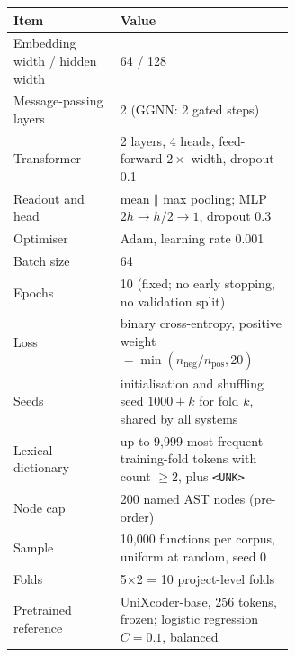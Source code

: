 \documentclass[pdflatex,sn-basic]{sn-jnl}
\let\toprule\hline\let\midrule\hline\let\bottomrule\hline\let\botrule\hline
\theoremstyle{thmstyleone}%
\begin{document}
\begin{tableorg}[t]
\centering
\caption{Hyper-parameters. All values are fixed in advance and shared by every
compared system; none is tuned on any fold.}
\label{tab:hparams}
\begin{tabular}{lp{0.62\linewidth}}
\toprule
Item & Value \\
\midrule
Embedding width / hidden width & 64 / 128 \\
Message-passing layers & 2 (GGNN: 2 gated steps) \\
Transformer & 2 layers, 4 heads, feed-forward $2\times$ width, dropout 0.1 \\
Readout and head & mean $\Vert$ max pooling; MLP $2h\to h/2\to 1$, dropout 0.3 \\
Optimiser & Adam, learning rate 0.001 \\
Batch size & 64 \\
Epochs & 10 (fixed; no early stopping, no validation split) \\
Loss & binary cross-entropy, positive weight $=\min(n_{\text{neg}}/n_{\text{pos}}, 20)$ \\
Seeds & initialisation and shuffling seed $1000+k$ for fold $k$, shared by all systems \\
Lexical dictionary & up to 9{,}999 most frequent training-fold tokens with count $\ge 2$, plus \texttt{<UNK>} \\
Node cap & 200 named AST nodes (pre-order) \\
Sample & 10,000 functions per corpus, uniform at random, seed 0 \\
Folds & 5$\times$2 = 10 project-level folds \\
Pretrained reference & UniXcoder-base, 256 tokens, frozen; logistic regression $C=0.1$, balanced \\
\bottomrule
\end{tabular}
\end{tableorg}
\end{document}
